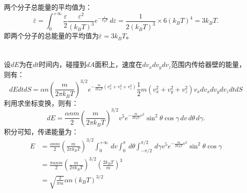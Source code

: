 \documentclass[a4paper,12pt]{article}
\begin{document}
\subsection{}
两个分子总能量的平均值为：
\begin{equation}\nonumber
	\bar{\varepsilon} = \int_{0}^{+\infty} \frac{\varepsilon}{2} \frac{\varepsilon^2}{(k_BT)^3} e^{-\frac{\varepsilon}{k_BT}} \,d\varepsilon = \frac{1}{2(k_BT)^3} \times 6(k_BT)^4 = 3k_BT.
\end{equation}
即两个分子的总能量的平均值为$\bar{\varepsilon} = 3k_BT$。


\section{}
设$dE$为在$dt$时间内，碰撞到$dA$面积上，速度在$dv_x dv_y dv_z$范围内传给器壁的能量，则有：
\begin{equation*}
	dE dt dS = \alpha n \left( \frac{m}{2\pi k_BT} \right)^{3/2} e^{-\frac{m}{2k_BT}(v_x^2 + v_z^2 + v_z^2)} \frac{1}{2}m(v_x^2 + v_y^2 + v_z^2) v_x dv_x dv_y dv_z dt dS
\end{equation*}
利用求坐标变换，则有：
\begin{equation*}
	dE = \frac{\alpha nm}{2} \left( \frac{m}{2\pi k_BT} \right)^{3/2} v^5 e^{-\frac{m}{2k_BT} v^2} \sin^2\theta \cos\gamma \,dv \,d\theta \,d\gamma.
\end{equation*}
积分可知，传递能量为：
\begin{equation*}
\begin{aligned}
	E &= \frac{\alpha nm}{2} \left( \frac{m}{2\pi k_BT} \right)^{3/2} \int_0^{+\infty} \,dv \int_{0}^{\pi} \,d\theta \int_{-\pi/2}^{\pi/2} \,d\gamma v^5 e^{-\frac{m}{2k_BT} v^2} \sin^2\theta \cos\gamma \\
	&= \frac{\pi\alpha nm}{2} \left( \frac{m}{2\pi k_BT} \right)^{3/2} \left( \frac{2k_BT}{m} \right)^3 \\
	&= \sqrt{\frac{2}{\pi m}}\alpha n\left( k_BT \right)^{3/2}
\end{aligned}
\end{equation*}
\end{document}
